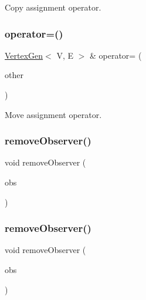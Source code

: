 Copy assignment operator. 

\mbox{\label{classVertexGen_afa38659fe8bf4a66b0e3f7c4d37f347f}} 
\subsubsection{\texorpdfstring{operator=()}{operator=()}\hspace{0.1cm}{\footnotesize\ttfamily [2/2]}}
{\footnotesize\ttfamily \mbox{\hyperlink{classVertexGen}{Vertex\+Gen}}$<$ V, E $>$ \& operator= (\begin{DoxyParamCaption}\item[{\mbox{\hyperlink{classVertexGen}{Vertex\+Gen}}$<$ V, E $>$ \&\&}]{other }\end{DoxyParamCaption})}



Move assignment operator. 

\mbox{\label{classObservable_a2fbb493a74c7c4a7604326bffcd75dbd}} 
\subsubsection{\texorpdfstring{remove\+Observer()}{removeObserver()}\hspace{0.1cm}{\footnotesize\ttfamily [1/2]}}
{\footnotesize\ttfamily void remove\+Observer (\begin{DoxyParamCaption}\item[{\mbox{\hyperlink{classObserver}{Observer}}$<$ int  $>$ $\ast$}]{obs }\end{DoxyParamCaption})\hspace{0.3cm}{\ttfamily [inherited]}}

\mbox{\label{classObservable_a36b9c4607c1cab08dc800daa5aa38b82}} 
\subsubsection{\texorpdfstring{remove\+Observer()}{removeObserver()}\hspace{0.1cm}{\footnotesize\ttfamily [2/2]}}
{\footnotesize\ttfamily void remove\+Observer (\begin{DoxyParamCaption}\item[{\mbox{\hyperlink{classObserver}{Observer}}$<$ int  $>$ \&}]{obs }\end{DoxyParamCaption})\hspace{0.3cm}{\ttfamily [inherited]}}

